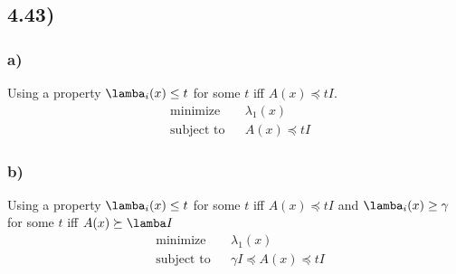 \documentclass[12pt]{article}
\begin{document}
\subsection*{4.43)}

\subsubsection*{a)}

Using a property $\lamba_i(x) \le t$ for some $t$ iff $A(x) \preceq tI$.
\begin{equation*}
\begin{aligned}
& {\text{minimize}}
& & \lambda_1(x)\\
& \text{subject to}
& & A(x) \preceq tI
\end{aligned}
\end{equation*}

\subsubsection*{b)}
Using a property $\lamba_i(x) \le t$ for some $t$ iff $A(x) \preceq tI$ and
$\lamba_i(x) \ge \gamma$ for some $t$ iff $A(x) \succeq \lamba I$
\begin{equation*}
\begin{aligned}
& {\text{minimize}}
& & \lambda_1(x)\\
& \text{subject to}
& & \gamma I \preceq A(x) \preceq tI
\end{aligned}
\end{equation*}


 
\end{document}
